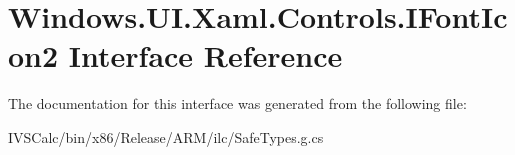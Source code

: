 \hypertarget{interface_windows_1_1_u_i_1_1_xaml_1_1_controls_1_1_i_font_icon2}{}\section{Windows.\+U\+I.\+Xaml.\+Controls.\+I\+Font\+Icon2 Interface Reference}
\label{interface_windows_1_1_u_i_1_1_xaml_1_1_controls_1_1_i_font_icon2}


The documentation for this interface was generated from the following file\+:\begin{DoxyCompactItemize}
\item 
I\+V\+S\+Calc/bin/x86/\+Release/\+A\+R\+M/ilc/Safe\+Types.\+g.\+cs\end{DoxyCompactItemize}
